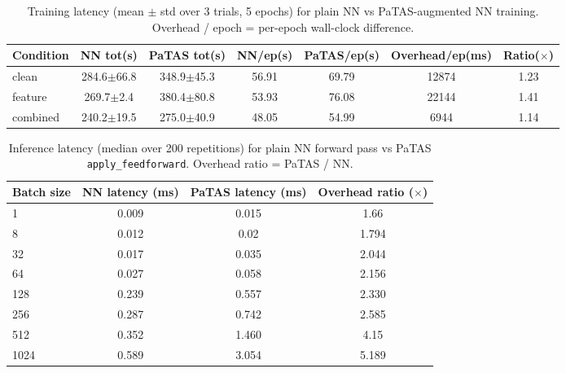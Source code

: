 

\begin{table}[ht]
\centering
\caption{Training latency (mean $\pm$ std over 3 trials, 5 epochs) for plain NN vs PaTAS-augmented NN training. Overhead / epoch = per-epoch wall-clock difference.}
\label{tab:latency-training}
\begin{tabular}{lcccccc}
\toprule
Condition & NN tot(s) & PaTAS tot(s) & NN/ep(s) & PaTAS/ep(s) & Overhead/ep(ms) & Ratio($\times$) \\
\midrule
clean & 284.6$\pm$66.8 & 348.9$\pm$45.3 & 56.91 & 69.79 & 12874 & 1.23 \\
feature & 269.7$\pm$2.4 & 380.4$\pm$80.8 & 53.93 & 76.08 & 22144 & 1.41 \\
combined & 240.2$\pm$19.5 & 275.0$\pm$40.9 & 48.05 & 54.99 & 6944 & 1.14 \\
\bottomrule
\end{tabular}
\end{table}


\begin{table}[ht]
\centering
\caption{Inference latency (median over 200 repetitions) for plain NN forward pass vs PaTAS \texttt{apply\_feedforward}. Overhead ratio = PaTAS / NN.}
\label{tab:latency-inference}
\begin{tabular}{lccc}
\toprule
Batch size & NN latency (ms) & PaTAS latency (ms) & Overhead ratio ($\times$) \\
\midrule
1 & 0.009 & 0.015 & 1.66 \\
8 & 0.012 & 0.02 & 1.794 \\
32 & 0.017 & 0.035 & 2.044 \\
64 & 0.027 & 0.058 & 2.156 \\
128 & 0.239 & 0.557 & 2.330 \\
256 & 0.287 & 0.742 & 2.585 \\
512 & 0.352 & 1.460 & 4.15 \\
1024 & 0.589 & 3.054 & 5.189 \\
\bottomrule
\end{tabular}
\end{table}


